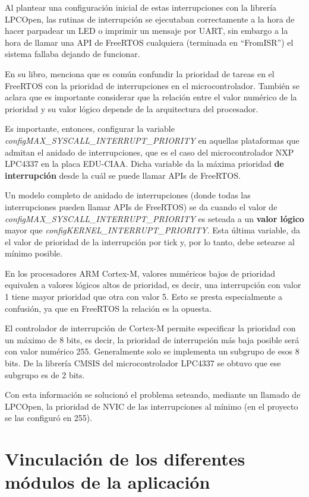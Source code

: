 \documentclass{IEEEtran}
\begin{document}
Al plantear una configuración inicial de estas interrupciones con la librería LPCOpen, las rutinas de interrupción se ejecutaban correctamente a la hora de hacer parpadear un LED o imprimir un mensaje por UART, sin embargo a la hora de llamar una API de FreeRTOS cualquiera (terminada en ``FromISR'') el sistema fallaba dejando de funcionar.

En su libro, \textcite{FreeRTOS} menciona que es común confundir la prioridad de tareas en el FreeRTOS con la prioridad de interrupciones en el microcontrolador. También se aclara que es importante considerar que la relación entre el valor numérico de la prioridad y su valor lógico depende de la arquitectura del procesador.

Es importante, entonces, configurar la variable \textit{configMAX\_SYSCALL\_INTERRUPT\_PRIORITY} en aquellas plataformas que admitan el anidado de interrupciones, que es el caso del microcontrolador NXP LPC4337 en la placa EDU-CIAA. Dicha variable da la máxima prioridad \textbf{de interrupción} desde la cuál se puede llamar APIs de FreeRTOS.

Un modelo completo de anidado de interrupciones (donde todas las interrupciones pueden llamar APIs de FreeRTOS) se da cuando el valor de \textit{configMAX\_SYSCALL\_INTERRUPT\_PRIORITY} es seteada a un \textbf{valor lógico} mayor que \textit{configKERNEL\_INTERRUPT\_PRIORITY}. Esta última variable, da el valor de prioridad de la interrupción por tick y, por lo tanto, debe setearse al mínimo posible.

En los procesadores ARM Cortex-M, valores numéricos bajos de prioridad equivalen a valores lógicos altos de prioridad, es decir, una interrupción con valor 1 tiene mayor prioridad que otra con valor 5. Esto se presta especialmente a confusión, ya que en FreeRTOS la relación es la opuesta.

El controlador de interrupción de Cortex-M permite especificar la prioridad con un máximo de 8 bits, es decir, la prioridad de interrupción más baja posible será con valor numérico 255. Generalmente solo se implementa un subgrupo de esos 8 bits. De la librería CMSIS del microcontrolador LPC4337 se obtuvo que ese subgrupo es de 2 bits.

Con esta información se solucionó el problema seteando, mediante un llamado de LPCOpen, la prioridad de NVIC de las interrupciones al mínimo (en el proyecto se las configuró en 255).

\section{Vinculación de los diferentes módulos de la aplicación}
\label{sec:vinculacion}
\end{document}
